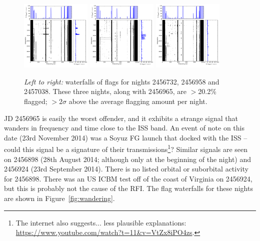 \documentclass[10pt,a4paper]{article}
\begin{document}
\begin{figure}
\centering
\includegraphics[width=0.3\textwidth]{RFI-images/2456732RFI.png}
\includegraphics[width=0.3\textwidth]{RFI-images/2456958RFI.png}
\includegraphics[width=0.3\textwidth]{RFI-images/2457038RFI.png}
\caption{\textit{Left to right:} waterfalls of flags for nights 2456732, 2456958 and 2457038. These three nights, along with 2456965, are $>$20.2\% flagged; $>2\sigma$ above the average flagging amount per night.}
\end{figure}


JD 2456965 is easily the worst offender, and it exhibits a strange signal that wanders in frequency and time close to the ISS band. An event of note on this date (23rd November 2014) was a Soyuz FG launch that docked with the ISS -- could this signal be a signature of their transmissions\footnote{The internet also suggests... less plausible explanations: \url{https://www.youtube.com/watch?t=11&v=VtZx8iPO4zs}. }? 
Similar signals are seen on 2456898 (28th August 2014; although only at the beginning of the night) and 2456924 (23rd September 2014). There is no listed orbital or suborbital activity for 2456898. There was an US ICBM test off of the coast of Virginia on 2456924, but this is probably not the cause of the RFI.
The flag waterfalls for these nights are shown in Figure~\ref{fig:wandering}.
\end{document}
